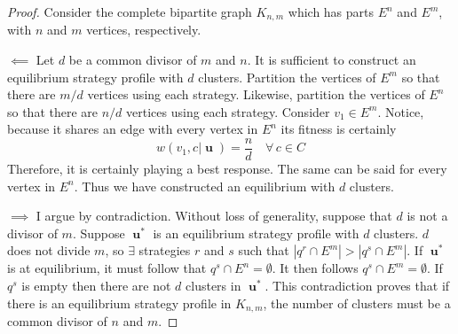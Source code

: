 \documentclass[]{article}
\DeclareMathOperator{\uu}{\mathbf{u}}
\begin{document}
		\begin{proof} Consider the complete bipartite graph $K_{n,m}$ which has parts $E^n$ and $E^m$, with $n$ and $m$ vertices, respectively. 
			
			 
			$\impliedby$ Let $d$ be a common divisor of $m$ and $n$. It is sufficient to construct an equilibrium strategy profile with $d$ clusters. Partition the vertices of $E^m$ so that there are $m/d$ vertices using each strategy. Likewise, partition the vertices of $E^n$ so that there are $n/d$ vertices using each strategy. Consider $v_1\in E^m$.  Notice, because it shares an edge with every vertex in $E^n$ its fitness is certainly 
			\begin{equation}
				w(v_1,c|\uu)=\frac{n}{d}\quad \forall\, c\in C
			\end{equation}
			Therefore, it is certainly playing a best response. The same can be said for every vertex in $E^n$. Thus we have constructed an equilibrium with $d$ clusters.
			
			
			$\implies$ I argue by contradiction.   Without loss of generality, suppose that $d$ is not a divisor of $m$. Suppose $\uu^*$ is an equilibrium strategy profile with $d$ clusters. $d$ does not divide $m$, so $\exists$ strategies $r$ and $s$ such that $|q^r\cap E^m|>|q^s\cap E^m|$. If $\uu^*$ is at equilibrium, it must follow that $q^s\cap E^n=\emptyset$. It then follows $q^s\cap E^m =\emptyset$. If $q^s$ is empty then there are not $d$ clusters in $\uu^*$. This contradiction proves that if there is an equilibrium strategy profile in $K_{n,m}$, the number of clusters must be a common divisor of $n$ and $m$.   
		\end{proof}
\end{document}
